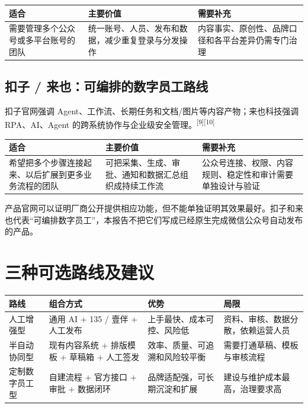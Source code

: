 \documentclass[UTF8,11pt,a4paper,fontset=none]{ctexart}
\newcommand{\srcref}[1]{\textsuperscript{\textcolor{BrandBlue}{[#1]}}}
\begin{document}
\begin{tabularx}{\textwidth}{@{}L{30mm} Y Y@{}}
\toprule
\textbf{适合} & \textbf{主要价值} & \textbf{需要补充} \\
\midrule
需要管理多个公众号或多平台账号的团队 & 统一账号、人员、发布和数据，减少重复登录与分发操作 & 内容事实、原创性、品牌口径和各平台差异仍需专门治理 \\
\bottomrule
\end{tabularx}

\subsection{扣子 / 来也：可编排的数字员工路线}

扣子官网强调 Agent、工作流、长期任务和文档/图片等内容产物；来也科技强调 RPA、AI、Agent 的跨系统协作与企业级安全管理。\srcref{9}\srcref{10}

\begin{tabularx}{\textwidth}{@{}L{30mm} Y Y@{}}
\toprule
\textbf{适合} & \textbf{主要价值} & \textbf{需要补充} \\
\midrule
希望把多个步骤连接起来、以后扩展到更多业务流程的团队 & 可把采集、生成、审批、通知和数据汇总组织成持续工作流 & 公众号连接、权限、内容规则、稳定性和审计需要单独设计与验证 \\
\bottomrule
\end{tabularx}

\begin{riskbox}[调研判断边界]
产品官网可以证明厂商公开提供相应功能，但不能单独证明其效果最好。扣子和来也代表“可编排数字员工”，本报告不把它们写成已经原生完成微信公众号自动发布的产品。
\end{riskbox}

\section{三种可选路线及建议}

\begin{tabularx}{\textwidth}{@{}L{29mm} L{34mm} Y Y@{}}
\toprule
\textbf{路线} & \textbf{组合方式} & \textbf{优势} & \textbf{局限} \\
\midrule
人工增强型 & 通用 AI + 135 / 壹伴 + 人工发布 & 上手最快、成本可控、风险低 & 资料、审核、数据分散，依赖运营人员 \\
半自动协同型 & 现有内容系统 + 排版模板 + 草稿箱 + 人工签发 & 效率、质量、可追溯和风险较平衡 & 需要打通草稿、模板与审核流程 \\
定制数字员工型 & 自建流程 + 官方接口 + 审批 + 数据闭环 & 品牌适配强，可长期沉淀和扩展 & 建设与维护成本最高，治理要求高 \\
\bottomrule
\end{tabularx}
\end{document}

